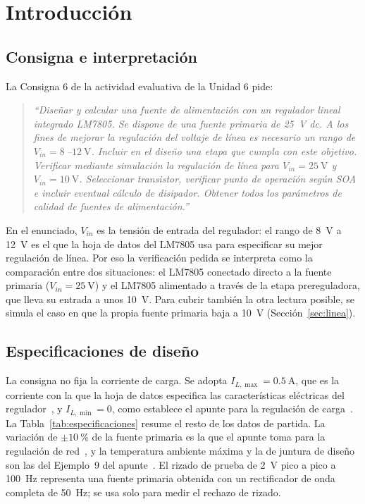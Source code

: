 \section{Introducción}

\subsection{Consigna e interpretación}
La Consigna 6 de la actividad evaluativa de la Unidad 6 pide:
\begin{quote}
\emph{``Diseñar y calcular una fuente de alimentación con un regulador lineal integrado LM7805. Se dispone de una fuente primaria de \SI{25}{\volt} dc. A los fines de mejorar la regulación del voltaje de línea es necesario un rango de $V_{in} = \SI{8}{}$--$\SI{12}{\volt}$. Incluir en el diseño una etapa que cumpla con este objetivo. Verificar mediante simulación la regulación de línea para $V_{in} = \SI{25}{\volt}$ y $V_{in} = \SI{10}{\volt}$. Seleccionar transistor, verificar punto de operación según SOA e incluir eventual cálculo de disipador. Obtener todos los parámetros de calidad de fuentes de alimentación.''}
\end{quote}

En el enunciado, $V_{in}$ es la tensión de entrada del regulador: el rango de \SI{8}{\volt} a \SI{12}{\volt} es el que la hoja de datos del LM7805 usa para especificar su mejor regulación de línea. Por eso la verificación pedida se interpreta como la comparación entre dos situaciones: el LM7805 conectado directo a la fuente primaria ($V_{in} = \SI{25}{\volt}$) y el LM7805 alimentado a través de la etapa prereguladora, que lleva su entrada a unos \SI{10}{\volt}. Para cubrir también la otra lectura posible, se simula el caso en que la propia fuente primaria baja a \SI{10}{\volt} (Sección~\ref{sec:linea}).

\subsection{Especificaciones de diseño}
La consigna no fija la corriente de carga. Se adopta $I_{L,\max} = \SI{0,5}{\ampere}$, que es la corriente con la que la hoja de datos especifica las características eléctricas del regulador~\cite{ua78}, y $I_{L,\min} = 0$, como establece el apunte para la regulación de carga~\cite[Sec.~6-6-3b]{ap2}. La Tabla~\ref{tab:especificaciones} resume el resto de los datos de partida. La variación de $\pm\SI{10}{\percent}$ de la fuente primaria es la que el apunte toma para la regulación de red~\cite[Sec.~6-6-3a]{ap2}, y la temperatura ambiente máxima y la de juntura de diseño son las del Ejemplo~9 del apunte~\cite[Sec.~6-8-3b]{ap2}. El rizado de prueba de \SI{2}{\volt} pico a pico a \SI{100}{\hertz} representa una fuente primaria obtenida con un rectificador de onda completa de \SI{50}{\hertz}; se usa solo para medir el rechazo de rizado.

